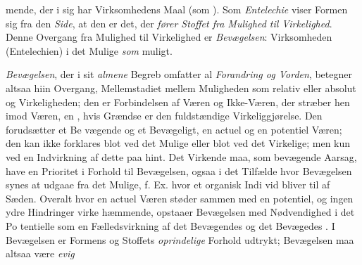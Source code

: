 mende, der i sig har Virksomhedens Maal (som 
). Som \emph{Entelechie} viser Formen sig fra den
\emph{Side}, at den er det, der \emph{fører Stoffet fra Mulighed til
Virkelighed}. Denne Overgang fra Mulighed til Virkelighed
er \emph{Bevægelsen}: Virksomheden (Entelechien) i det Mulige
\emph{som} muligt.

\emph{Bevægelsen}, der i sit \emph{almene} Begreb omfatter al
\emph{Forandring og Vorden}, betegner altsaa hiin Overgang,
Mellemstadiet mellem Muligheden som relativ eller absolut og
Virkeligheden; den er Forbindelsen af Væren og Ikke-Væren,
der stræber hen imod Væren, en , hvis Grændse
er den fuldstændige Virkeliggjørelse. Den forudsætter et Be\-%
vægende og et Bevægeligt, en actuel og en potentiel Væren;
den kan ikke forklares blot ved det Mulige eller blot ved det
Virkelige; men kun ved en Indvirkning af dette paa hint. Det
Virkende maa, som bevægende Aarsag, have en Prioritet i
Forhold til Bevægelsen, ogsaa i det Tilfælde hvor Bevægelsen
synes at udgaae fra det Mulige, f. Ex. hvor et organisk Indi\-%
vid bliver til af Sæden. Overalt hvor en actuel Væren støder
sammen med en potentiel, og ingen ydre Hindringer virke
hæmmende, opstaaer Bevægelsen med Nødvendighed i det Po\-%
tentielle som en Fælledsvirkning af det Bevægendes  og
det Bevægedes . I Bevægelsen er Formens og Stoffets
\emph{oprindelige} Forhold udtrykt; Bevægelsen maa altsaa være \emph{evig}
